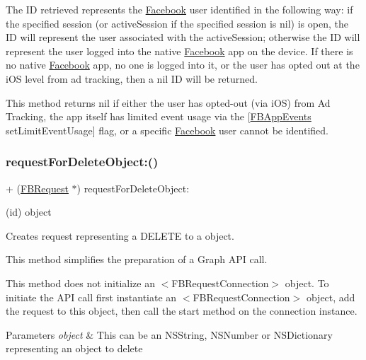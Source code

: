 The ID retrieved represents the \hyperlink{interfaceFacebook}{Facebook} user identified in the following way\+: if the specified session (or active\+Session if the specified session is {\ttfamily nil}) is open, the ID will represent the user associated with the active\+Session; otherwise the ID will represent the user logged into the native \hyperlink{interfaceFacebook}{Facebook} app on the device. If there is no native \hyperlink{interfaceFacebook}{Facebook} app, no one is logged into it, or the user has opted out at the i\+OS level from ad tracking, then a {\ttfamily nil} ID will be returned.

This method returns {\ttfamily nil} if either the user has opted-\/out (via i\+OS) from Ad Tracking, the app itself has limited event usage via the {\ttfamily \mbox{[}\hyperlink{interfaceFBAppEvents}{F\+B\+App\+Events} set\+Limit\+Event\+Usage\mbox{]}} flag, or a specific \hyperlink{interfaceFacebook}{Facebook} user cannot be identified. \mbox{\label{interfaceFBRequest_a6d457b796765de6b436e5ff6cf11cc44}} 
\subsubsection{\texorpdfstring{request\+For\+Delete\+Object\+:()}{requestForDeleteObject:()}\hspace{0.1cm}{\footnotesize\ttfamily [1/5]}}
{\footnotesize\ttfamily + (\hyperlink{interfaceFBRequest}{F\+B\+Request} $\ast$) request\+For\+Delete\+Object\+: \begin{DoxyParamCaption}\item[{(id)}]{object }\end{DoxyParamCaption}}

Creates request representing a D\+E\+L\+E\+TE to a object.

This method simplifies the preparation of a Graph A\+PI call.

This method does not initialize an $<$\+F\+B\+Request\+Connection$>$ object. To initiate the A\+PI call first instantiate an $<$\+F\+B\+Request\+Connection$>$ object, add the request to this object, then call the {\ttfamily start} method on the connection instance.


\begin{DoxyParams}{Parameters}
{\em object} & This can be an N\+S\+String, N\+S\+Number or N\+S\+Dictionary representing an object to delete \\
\hline
\end{DoxyParams}
\mbox{\label{interfaceFBRequest_a6d457b796765de6b436e5ff6cf11cc44}} 
